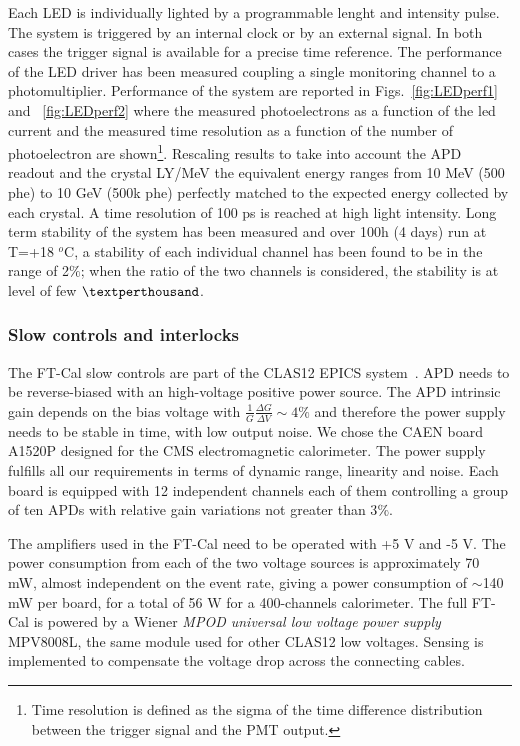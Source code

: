 Each LED is individually lighted by a programmable
lenght and intensity pulse. The
system is triggered by an internal clock or by
an external signal. In both cases the trigger
signal is available for a precise time reference.
The performance of the LED driver
has been measured coupling a single monitoring
channel to a photomultiplier. Performance of the system are reported in Figs.~\ref{fig:LEDperf1} and ~\ref{fig:LEDperf2} where the measured photoelectrons
as a function of the led current and the measured time resolution as
a function of the number of photoelectron are shown\footnote{Time resolution is defined as the sigma of the time difference distribution
between the trigger signal and the
PMT output.}. Rescaling
results to take into account the APD readout
and the crystal LY/MeV the equivalent
energy ranges from 10 MeV (500 phe) to 10
GeV (500k phe) perfectly matched to the expected
energy collected by each crystal. A time resolution
of 100 ps is reached at high light
intensity. Long term stability of the system has been measured and over 100h (4 days) run at
T=+18 $^o$C, a stability of each individual
channel has been found to be in the range of 2$\%$;  when the ratio
of the two channels is considered,
the stability is at level of few $\textperthousand$.

\subsubsection{Slow controls and interlocks}
The FT-Cal slow controls are part of the CLAS12 EPICS system~\cite{daq}.
APD  needs to be reverse-biased
with an high-voltage positive power
source. The APD intrinsic
gain depends on the bias voltage with
$\frac{1}{G}\frac{\Delta G}{\Delta V} \sim4 \%$
and therefore the power supply
needs to be stable in time, with low output
noise. We chose the CAEN board A1520P designed
for the CMS electromagnetic
calorimeter. The power supply fulfills  all our requirements in
terms of dynamic range, linearity and noise.
Each board is equipped with 12 independent
channels each of them controlling a group of ten APDs
 with relative
gain variations not greater than 3$\%$.

The amplifiers used in the FT-Cal need to
be operated with +5 V and -5 V.
The power consumption from
each of the two voltage sources is approximately
70 mW, almost independent on the
event rate, giving a power consumption of
$\sim$140 mW per board, for a total of 56 W for
a 400-channels calorimeter. 
The full FT-Cal is powered by a Wiener
{\it MPOD universal low voltage power supply} MPV8008L,
the same module used for other CLAS12 low voltages.
Sensing is implemented
to compensate the voltage drop across
the connecting cables.

